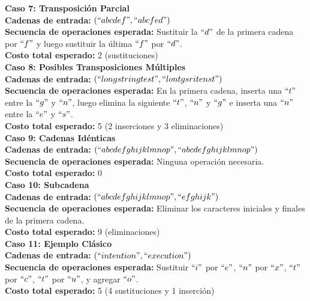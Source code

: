 \noindent \textbf{\large{Caso 7: Transposición Parcial}}\\
\textbf{Cadenas de entrada:} \texttt{$(``abcdef", ``abcfed")$} \\
\textbf{Secuencia de operaciones esperada:} Sustituir la $``d"$ de la primera cadena por $``f"$ y luego sustituir la última $``f"$ por $``d"$. \\
\textbf{Costo total esperado:} 2 (sustituciones) \\

\noindent \textbf{\large{Caso 8: Posibles Transposiciones Múltiples}}\\
\textbf{Cadenas de entrada:} \texttt{$(``longstringtest", ``lontgsritenst")$} \\ 
\textbf{Secuencia de operaciones esperada:} En la primera cadena, inserta una $``t"$ entre la $``g"$ y $``n"$, luego elimina la siguiente $``t"$, $``n"$ y $``g"$ e inserta una $``n"$ entre la $``e"$ y $``s"$.\\
\textbf{Costo total esperado:} 5 (2 inserciones y 3 eliminaciones) \\

\noindent \textbf{\large{Caso 9: Cadenas Idénticas}}\\
\textbf{Cadenas de entrada:} \texttt{$(``abcdefghijklmnop", ``abcdefghijklmnop")$} \\
\textbf{Secuencia de operaciones esperada:} Ninguna operación necesaria. \\
\textbf{Costo total esperado:} 0 \\

\noindent \textbf{\large{Caso 10: Subcadena}}\\
\textbf{Cadenas de entrada:} \texttt{$(``abcdefghijklmnop", ``efghijk")$} \\
\textbf{Secuencia de operaciones esperada:} Eliminar los caracteres iniciales y finales de la primera cadena. \\
\textbf{Costo total esperado:} 9 (eliminaciones) \\

\noindent \textbf{\large{Caso 11: Ejemplo Clásico}}\\
\textbf{Cadenas de entrada:} \texttt{$(``intention", ``execution")$} \\
\textbf{Secuencia de operaciones esperada:} Sustituir $``i"$ por $``e"$, $``n"$ por $``x"$, $``t"$ por $``c"$, $``t"$ por $``u"$, y agregar $``o"$. \\
\textbf{Costo total esperado:} 5 (4 sustituciones y 1 inserción) \\
